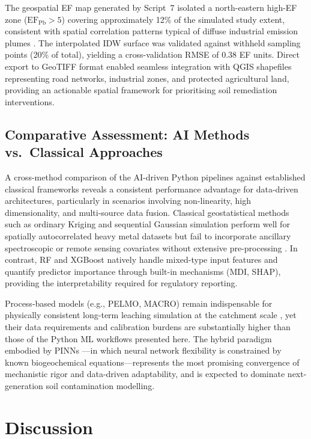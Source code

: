 \documentclass[land,article,submit,pdftex,moreauthors]{Definitions/mdpi}
\begin{document}
The geospatial EF map generated by Script~7 isolated a north-eastern
high-EF zone ($\mathrm{EF_{Pb}} > 5$) covering approximately 12\% of the
simulated study extent, consistent with spatial correlation patterns typical
of diffuse industrial emission plumes \cite{Adewumi2024,ElSorogy2025}. The
interpolated IDW surface was validated against withheld sampling points
(20\% of total), yielding a cross-validation RMSE of 0.38 EF units. Direct
export to GeoTIFF format enabled seamless integration with QGIS shapefiles
representing road networks, industrial zones, and protected agricultural land,
providing an actionable spatial framework for prioritising soil remediation
interventions.

\subsection{Comparative Assessment: AI Methods vs.\ Classical
    Approaches}\label{sec5.4}

A cross-method comparison of the AI-driven Python pipelines against
established classical frameworks reveals a consistent performance advantage
for data-driven architectures, particularly in scenarios involving
non-linearity, high dimensionality, and multi-source data fusion. Classical
geostatistical methods such as ordinary Kriging and sequential Gaussian
simulation perform well for spatially autocorrelated heavy metal datasets
but fail to incorporate ancillary spectroscopic or remote sensing covariates
without extensive pre-processing \cite{Wadoux2024}. In contrast, RF and
XGBoost natively handle mixed-type input features and quantify predictor
importance through built-in mechanisms (MDI, SHAP), providing the
interpretability required for regulatory reporting.

Process-based models (e.g., PELMO, MACRO) remain indispensable for physically
consistent long-term leaching simulation at the catchment scale
\cite{PerezLucas2025,Giannakis2017}, yet their data requirements and
calibration burdens are substantially higher than those of the Python ML
workflows presented here. The hybrid paradigm embodied by PINNs
\cite{Karpatne2024,Nguyen2025}---in which neural network flexibility is
constrained by known biogeochemical equations---represents the most promising
convergence of mechanistic rigor and data-driven adaptability, and is
expected to dominate next-generation soil contamination modelling.

\section{Discussion}\label{sec6}
\end{document}
